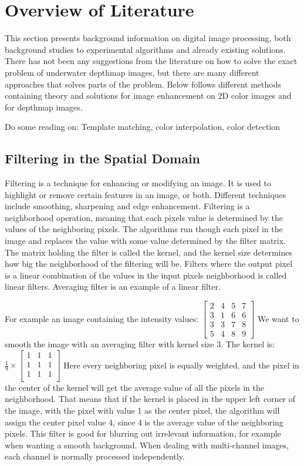\section{Overview of Literature}\label{overview}
This section presents background information on digital image processing, both background studies to experimental algorithms and already existing solutions. There has not been any suggestions from the literature on how to solve the exact problem of underwater depthmap images, but there are many different approaches that solves parts of the problem.
Below follows different methods containing theory and solutions for image enhancement on 2D color images and for depthmap images.


{\color{red}Do some reading on: Template matching, color interpolation, color detection}


\subsection{Filtering in the Spatial Domain}

Filtering is a technique for enhancing or modifying an image. It is used to highlight or remove certain features in an image, or both. Different techniques include smoothing, sharpening and edge enhancement. 
Filtering is a neighborhood operation, meaning that each pixels value is determined by the values of the neighboring pixels. The algorithms run though each pixel in the image and replaces the value with some value determined by the filter matrix. The matrix holding the filter is called the kernel, and the kernel size determines how big the neighborhood of the filtering will be. Filters where the output pixel is a linear combination of the values in the input pixels neighborhood is called linear filters. Averaging filter is an example of a linear filter.

For example an image containing the intensity values: 
$\begin{bmatrix}
    2 & 4 & 5 & 7 \\
    3 & 1 & 6 & 6 \\
    3 & 3 & 7 & 8 \\
    5 & 4 & 8 & 9 
\end{bmatrix}$
We want to smooth the image with an averaging filter with kernel size 3. The kernel is: 
$\frac{1}{9} \times 
\begin{bmatrix}
    1 & 1 & 1 \\
    1 & 1 & 1 \\
    1 & 1 & 1 \\
\end{bmatrix}$
Here every neighboring pixel is equally weighted, and the pixel in the center of the kernel will get the average value of all the pixels in the neighborhood. That means that if the kernel is placed in the upper left corner of the image, with the pixel with value 1 as the center pixel, the algorithm will assign the center pixel value 4, since 4 is the average value of the neighboring pixels.
This filter is good for blurring out irrelevant information, for example when wanting a smooth background.
When dealing with multi-channel images, each channel is normally processed independently.

